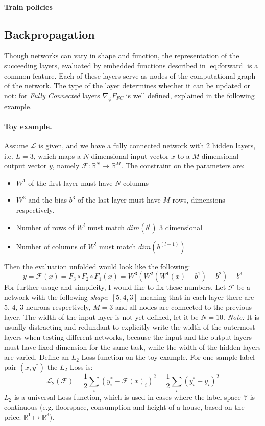 \paragraph{Train policies} 

\subsection{Backpropagation} 
Though networks can vary in shape and function, the representation of the succeeding layers, evaluated by embedded functions described in \ref{eq:forward} is a common feature. Each of these layers serve as nodes of the computational graph of the network. The type of the layer determines whether it can be updated or not: for \emph{Fully Connected} layers $\nabla_\phi F_{FC}$ is well defined, explained in the following example.

\paragraph{Toy example.} 
Assume $\mathcal{L}$ is given, and we have a fully connected network with 2 hidden layers, i.e. $L=3$, which maps a $N$ dimensional input vector $x$ to a $M$ dimensional output vector $y$, namely $\mathcal{F}:\mathbb{R}^N \mapsto \mathbb{R}^M$. The constraint on the parameters are:
\begin{itemize}
    \item[] $W^1$ of the first layer must have $N$ columns
    \item[] $W^3$ and the bias $b^3$ of the last layer must have $M$ rows, dimensions respectively.
    \item[] Number of rows of $W^l$ must match $dim(b^l)$ $3$ dimensional
    \item[] Number of columns of $W^l$ must match $dim(b^{(l-1)})$
\end{itemize} 
Then the evaluation unfolded would look like the following: 
$$y = \mathcal{F}(x) = F_3 \circ F_2 \circ F_1(x) = W^3(W^2(W^1(x)+b^1)+b^2)+b^3$$
For further usage and simplicity, I would like to fix these numbers.
Let $\mathcal{F}$ be a network with the following \emph{shape}: $\left[5, 4, 3\right] $
meaning that in each layer there are 5, 4, 3 neurons respectively, $M=3$ and all nodes are connected to the previous layer. The width of the input layer is not yet defined, let it be $N=10$. 
\emph{Note:} It is usually distracting and redundant to explicitly write the width of the outermost layers when testing different networks, because the input and the output layers must have fixed dimension for the same task, while the width of the hidden layers are varied.
Define an $L_2$ Loss function on the toy example. For one sample-label pair $(x,y^*)$ the $L_2$ Loss is:
\begin{equation}
    \mathcal{L}_2(\mathcal{F}) = \frac{1}{2} \sum_{i} (y_i^* - \mathcal{F}(x)_i)^2 = \frac{1}{2} \sum_{i} (y_i^* - y_i)^2
\end{equation}
$L_2$ is a universal Loss function, which is used in cases where the label space $\mathbb{Y}$ is continuous (e.g. floorspace, consumption and height of a house, based on the price: $\mathbb{R}^1 \mapsto \mathbb{R}^3$).

